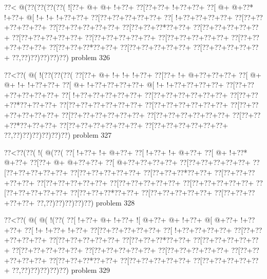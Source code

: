 \vbox{\vbox{\goo
\0??<\- @(\0??(\0??(\0??(\0??(
\- ![\0??+\- @+\- @+\- !+\0??+
\0??[\0??+\0??+\- !+\0??+\0??+
\0??[\- @+\- @+\0??*\- !+\0??+
\- @[\- !+\- !+\- !+\0??+\0??+
\0??[\0??+\0??+\0??+\0??+\0??+
\0??[\- !+\0??+\0??+\0??+\0??+
\0??[\0??+\0??+\0??+\0??+\0??+
\0??[\0??+\0??+\0??+\0??+\0??+
\0??[\0??+\0??+\0??*\0??+\0??+
\0??[\0??+\0??+\0??+\0??+\0??+
\0??[\0??+\0??+\0??+\0??+\0??+
\0??[\0??+\0??+\0??+\0??+\0??+
\0??[\0??+\0??+\0??+\0??+\0??+
\0??[\0??+\0??+\0??+\0??+\0??+
\0??[\0??+\0??+\0??*\0??+\0??+
\0??[\0??+\0??+\0??+\0??+\0??+
\0??[\0??+\0??+\0??+\0??+\0??+
\0??,\0??)\0??)\0??)\0??)\0??)
}
\hfil problem 326\hfil\break
}

\vbox{\vbox{\goo
\0??<\0??(\- @(\- !(\0??(\0??(\0??(
\0??[\0??+\- @+\- !+\- !+\- !+\0??+
\0??[\0??+\- !+\- @+\0??+\0??+\0??+
\0??[\- @+\- @+\- !+\- !+\0??+\0??+
\0??[\- @+\- !+\0??+\0??+\0??+\0??+
\- @[\- !+\- !+\0??+\0??+\0??+\0??+
\0??[\0??+\0??+\0??+\0??+\0??+\0??+
\0??[\- !+\0??+\0??+\0??+\0??+\0??+
\0??[\0??+\0??+\0??+\0??+\0??+\0??+
\0??[\0??+\0??+\0??*\0??+\0??+\0??+
\0??[\0??+\0??+\0??+\0??+\0??+\0??+
\0??[\0??+\0??+\0??+\0??+\0??+\0??+
\0??[\0??+\0??+\0??+\0??+\0??+\0??+
\0??[\0??+\0??+\0??+\0??+\0??+\0??+
\0??[\0??+\0??+\0??+\0??+\0??+\0??+
\0??[\0??+\0??+\0??*\0??+\0??+\0??+
\0??[\0??+\0??+\0??+\0??+\0??+\0??+
\0??[\0??+\0??+\0??+\0??+\0??+\0??+
\0??,\0??)\0??)\0??)\0??)\0??)\0??)
}
\hfil problem 327\hfil\break
}

\vbox{\vbox{\goo
\0??<\0??(\0??(\- !(\- @(\0??(
\0??[\- !+\0??+\- !+\- @+\0??+
\0??[\- !+\0??+\- !+\- @+\0??+
\0??[\- @+\- !+\0??*\- @+\0??+
\0??[\0??+\- @+\- @+\0??+\0??+
\0??[\- @+\0??+\0??+\0??+\0??+
\0??[\0??+\0??+\0??+\0??+\0??+
\0??[\0??+\0??+\0??+\0??+\0??+
\0??[\0??+\0??+\0??+\0??+\0??+
\0??[\0??+\0??+\0??*\0??+\0??+
\0??[\0??+\0??+\0??+\0??+\0??+
\0??[\0??+\0??+\0??+\0??+\0??+
\0??[\0??+\0??+\0??+\0??+\0??+
\0??[\0??+\0??+\0??+\0??+\0??+
\0??[\0??+\0??+\0??+\0??+\0??+
\0??[\0??+\0??+\0??*\0??+\0??+
\0??[\0??+\0??+\0??+\0??+\0??+
\0??[\0??+\0??+\0??+\0??+\0??+
\0??,\0??)\0??)\0??)\0??)\0??)
}
\hfil problem 328\hfil\break
}

\vbox{\vbox{\goo
\0??<\0??(\- @(\- @(\- !(\0??(
\0??[\- !+\0??+\- @+\- !+\0??+
\- ![\- @+\0??+\- @+\- !+\0??+
\- @[\- @+\0??+\- !+\0??+\0??+
\0??[\- !+\- !+\0??+\- !+\0??+
\0??[\0??+\0??+\0??+\0??+\0??+
\0??[\- !+\0??+\0??+\0??+\0??+
\0??[\0??+\0??+\0??+\0??+\0??+
\0??[\0??+\0??+\0??+\0??+\0??+
\0??[\0??+\0??+\0??*\0??+\0??+
\0??[\0??+\0??+\0??+\0??+\0??+
\0??[\0??+\0??+\0??+\0??+\0??+
\0??[\0??+\0??+\0??+\0??+\0??+
\0??[\0??+\0??+\0??+\0??+\0??+
\0??[\0??+\0??+\0??+\0??+\0??+
\0??[\0??+\0??+\0??*\0??+\0??+
\0??[\0??+\0??+\0??+\0??+\0??+
\0??[\0??+\0??+\0??+\0??+\0??+
\0??,\0??)\0??)\0??)\0??)\0??)
}
\hfil problem 329\hfil\break
}

